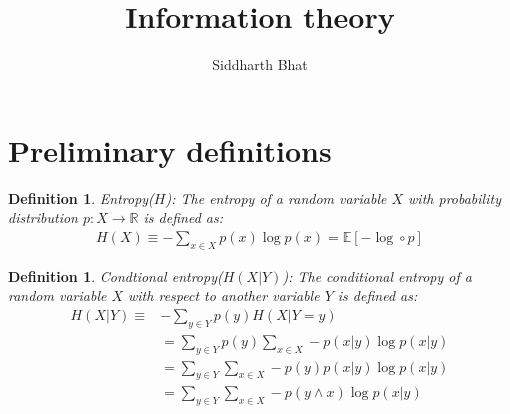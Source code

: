 \documentclass[11pt]{book}
\title{Information theory}
\author{Siddharth Bhat}
\date{}
\newtheorem{definition}[theorem]{Definition}
\renewcommand{\H}{\ensuremath{H}}
\newcommand{\E}{\ensuremath{\mathbb{E}}}
\newcommand{\R}{\ensuremath{\mathbb{R}}}
\begin{document}
\maketitle
\tableofcontents

\section{Preliminary definitions}

\begin{definition}
    Entropy(\H): The entropy of a random variable $X$ with probability
    distribution $p: X \rightarrow \R $ is defined as:
    \begin{align*}
        \H(X) \equiv - \sum_{x \in X} p(x) \log p(x) = \E[- \log \circ p]
    \end{align*}
\end{definition}

\begin{definition}
    Condtional entropy($\H(X|Y)$): The conditional entropy of a random 
    variable $X$ with respect to another variable $Y$ is defined as:
    \begin{align*}
        \H(X|Y) \equiv &- \sum_{y \in Y} p(y) \H(X|Y=y) \\
                       &= \sum_{y \in Y} p(y) \sum_{x \in X} - p(x|y) \log p(x | y)\\
                       &= \sum_{y \in Y} \sum_{x \in X} - p(y) p(x|y) \log p(x | y)\\
                       &= \sum_{y \in Y} \sum_{x \in X} - p(y \land x) \log p(x | y)\\
    \end{align*}
\end{definition}
\end{document}
